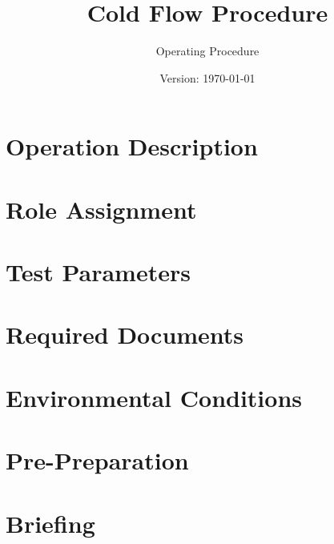 \documentclass{article}
\title{Cold Flow Procedure}
\author{Operating Procedure}
\date{Version: \isodate\today}
\begin{document}
\maketitle

\thispagestyle{fancy}

\renewcommand{\thesection}{\Alph{section}}

\section{Operation Description}


\section{Role Assignment}


\section{Test Parameters}


\section{Required Documents}


\section{Environmental Conditions}


\newpage

\newtoggle{firing}
\togglefalse{firing}

\renewcommand{\thesection}{\arabic{section}}

\setcounter{section}{0}

\section{Pre-Preparation}


\section{Briefing}

\end{document}
